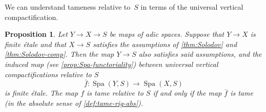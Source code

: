 \documentclass[a4paper,twoside,11pt,reqno]{amsart}
\DeclareMathOperator{\Spa}{Spa}
\newtheorem{prop}[thm]{Proposition}
\theoremstyle{definition}
\numberwithin{equation}{subsection}
\begin{document}
We can understand tameness relative to~$S$ in terms of the universal vertical compactification.

\begin{prop} \label{prop:tame-S-compactification}
    Let $Y\to X\to S$ be maps of adic spaces.
    Suppose that $Y\to X$ is finite \'etale and that $X\to S$ satisfies the assumptions of \cref{thm:Solodov} and \cref{thm:Solodov-comp}. Then the map $Y\to S$ also satisfies said assumptions, and the induced map (see \cref{prop:Spa-functoriality}) between universal vertical compactifications relative to $S$
        \[ 
            \bar{f}\colon \Spa(Y,S)\longrightarrow \Spa(X,S)
        \]
    is finite \'etale. The map $f$ is tame relative to $S$ if and only if the map $\bar{f}$ is tame (in the absolute sense of \cref{def:tame-rig-abs}).
\end{prop}
\end{document}
